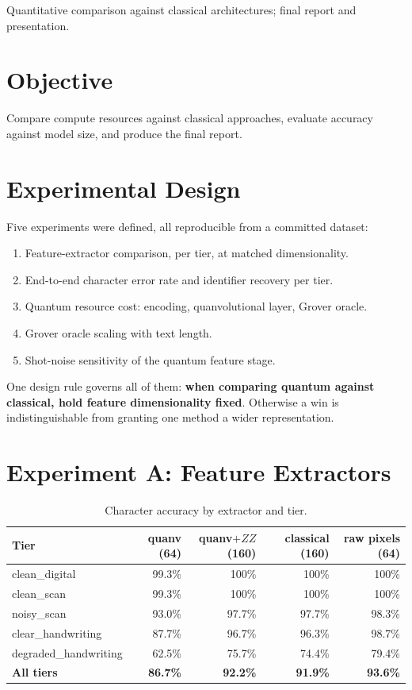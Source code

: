 \documentclass[11pt,a4paper]{article}
\begin{document}
{Quantitative comparison against classical architectures; final report and presentation.}

\section{Objective}

Compare compute resources against classical approaches, evaluate accuracy against
model size, and produce the final report.

\section{Experimental Design}

Five experiments were defined, all reproducible from a committed dataset:

\begin{enumerate}[label=\Alph*.]
\item Feature-extractor comparison, per tier, at matched dimensionality.
\item End-to-end character error rate and identifier recovery per tier.
\item Quantum resource cost: encoding, quanvolutional layer, Grover oracle.
\item Grover oracle scaling with text length.
\item Shot-noise sensitivity of the quantum feature stage.
\end{enumerate}

One design rule governs all of them: \textbf{when comparing quantum against
classical, hold feature dimensionality fixed}. Otherwise a win is
indistinguishable from granting one method a wider representation.

\section{Experiment A: Feature Extractors}

\begin{table}[h]
\centering
\caption{Character accuracy by extractor and tier.}
\small
\begin{tabular}{@{}lrrrr@{}}
\toprule
Tier & quanv (64) & quanv$+ZZ$ (160) & classical (160) & raw pixels (64) \\
\midrule
clean\_digital & 99.3\% & 100\% & 100\% & 100\% \\
clean\_scan & 99.3\% & 100\% & 100\% & 100\% \\
noisy\_scan & 93.0\% & 97.7\% & 97.7\% & 98.3\% \\
clear\_handwriting & 87.7\% & 96.7\% & 96.3\% & 98.7\% \\
degraded\_handwriting & 62.5\% & 75.7\% & 74.4\% & 79.4\% \\
\midrule
\textbf{All tiers} & \textbf{86.7\%} & \textbf{92.2\%} & \textbf{91.9\%} & \textbf{93.6\%} \\
\bottomrule
\end{tabular}
\end{table}
\end{document}
